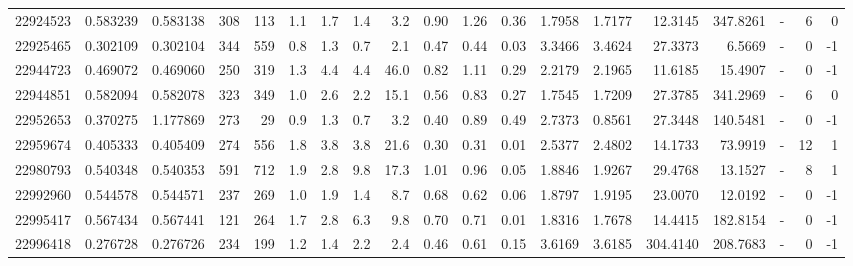 \begin{tabular}{rrrrrrrrrrrrrrrrlrr}
  22924523 & 0.583239 &   0.583138 &  308 &  113 &      1.1 &      1.7 &     1.4 &      3.2 &       0.90 &        1.26 &        0.36 &  1.7958 &  1.7177 &   12.3145 &  347.8261 &             - &        6 &          0 \\
  22925465 & 0.302109 &   0.302104 &  344 &  559 &      0.8 &      1.3 &     0.7 &      2.1 &       0.47 &        0.44 &        0.03 &  3.3466 &  3.4624 &   27.3373 &    6.5669 &             - &        0 &         -1 \\
  22944723 & 0.469072 &   0.469060 &  250 &  319 &      1.3 &      4.4 &     4.4 &     46.0 &       0.82 &        1.11 &        0.29 &  2.2179 &  2.1965 &   11.6185 &   15.4907 &             - &        0 &         -1 \\
  22944851 & 0.582094 &   0.582078 &  323 &  349 &      1.0 &      2.6 &     2.2 &     15.1 &       0.56 &        0.83 &        0.27 &  1.7545 &  1.7209 &   27.3785 &  341.2969 &             - &        6 &          0 \\
  22952653 & 0.370275 &   1.177869 &  273 &   29 &      0.9 &      1.3 &     0.7 &      3.2 &       0.40 &        0.89 &        0.49 &  2.7373 &  0.8561 &   27.3448 &  140.5481 &             - &        0 &         -1 \\
  22959674 & 0.405333 &   0.405409 &  274 &  556 &      1.8 &      3.8 &     3.8 &     21.6 &       0.30 &        0.31 &        0.01 &  2.5377 &  2.4802 &   14.1733 &   73.9919 &             - &       12 &          1 \\
  22980793 & 0.540348 &   0.540353 &  591 &  712 &      1.9 &      2.8 &     9.8 &     17.3 &       1.01 &        0.96 &        0.05 &  1.8846 &  1.9267 &   29.4768 &   13.1527 &             - &        8 &          1 \\
  22992960 & 0.544578 &   0.544571 &  237 &  269 &      1.0 &      1.9 &     1.4 &      8.7 &       0.68 &        0.62 &        0.06 &  1.8797 &  1.9195 &   23.0070 &   12.0192 &             - &        0 &         -1 \\
  22995417 & 0.567434 &   0.567441 &  121 &  264 &      1.7 &      2.8 &     6.3 &      9.8 &       0.70 &        0.71 &        0.01 &  1.8316 &  1.7678 &   14.4415 &  182.8154 &             - &        0 &         -1 \\
  22996418 & 0.276728 &   0.276726 &  234 &  199 &      1.2 &      1.4 &     2.2 &      2.4 &       0.46 &        0.61 &        0.15 &  3.6169 &  3.6185 &  304.4140 &  208.7683 &             - &        0 &         -1 \\

\end{tabular}
